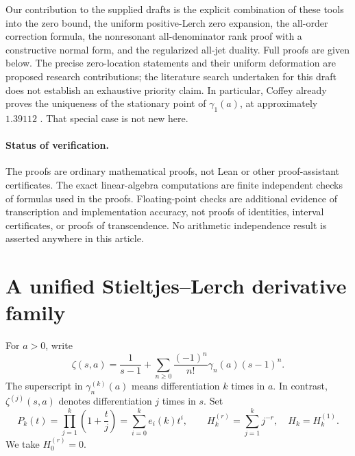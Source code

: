 \documentclass[11pt]{article}
\theoremstyle{definition}
\theoremstyle{remark}
\begin{document}
Our contribution to the supplied drafts is the explicit combination of these tools into the zero bound, the uniform positive-Lerch zero expansion, the all-order correction formula, the nonresonant all-denominator rank proof with a constructive normal form, and the regularized all-jet duality. Full proofs are given below. The precise zero-location statements and their uniform deformation are proposed research contributions; the literature search undertaken for this draft does not establish an exhaustive priority claim. In particular, Coffey already proves the uniqueness of the stationary point of $\gamma_1(a)$, at approximately $1.39112$ \cite[Proposition~5]{Coffey}. That special case is not new here.

\paragraph{Status of verification.}
The proofs are ordinary mathematical proofs, not Lean or other proof-assistant certificates. The exact linear-algebra computations are finite independent checks of formulas used in the proofs. Floating-point checks are additional evidence of transcription and implementation accuracy, not proofs of identities, interval certificates, or proofs of transcendence. No arithmetic independence result is asserted anywhere in this article.

\section{A unified Stieltjes--Lerch derivative family}
\label{sec:family}

For $a>0$, write
\begin{equation}\label{eq:laurent}
 \zeta(s,a)=\frac1{s-1}+\sum_{n\geq0}\frac{(-1)^n}{n!}\gamma_n(a)(s-1)^n.
\end{equation}
The superscript in $\gamma_n^{(k)}(a)$ means differentiation $k$ times in $a$. In contrast, $\zeta^{(j)}(s,a)$ denotes differentiation $j$ times in $s$. Set
\begin{equation}\label{eq:Pk}
 P_k(t)=\prod_{j=1}^k\left(1+\frac tj\right)
       =\sum_{i=0}^k e_i(k)t^i,
 \qquad H_k^{(r)}=\sum_{j=1}^k j^{-r},\quad H_k=H_k^{(1)}.
\end{equation}
We take $H_0^{(r)}=0$.
\end{document}
